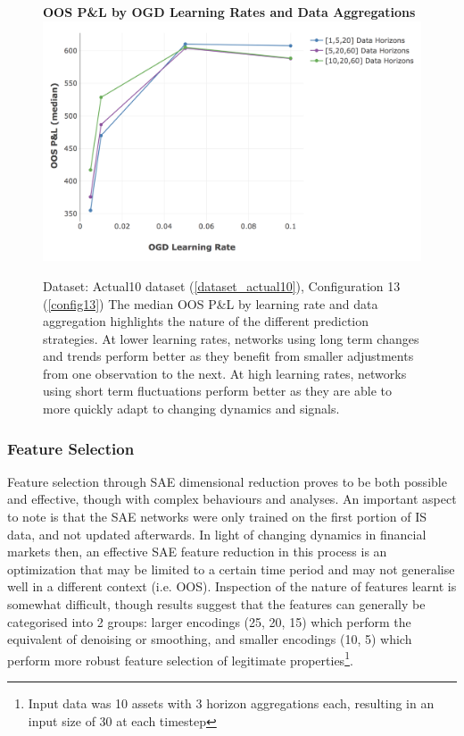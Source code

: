 \documentclass[a4paper,11pt,oneside]{article}
\theoremstyle{plain}
\theoremstyle{definition}
\begin{document}
	\begin{figure}[H]
		\textbf{OOS P\&L by OGD Learning Rates and Data Aggregations}
		\centering
		\includegraphics[scale=0.45]{images/results/primary/OOS_OGDLR_Delta_PL_median.png}
		\caption[OOS P\&L by OGD Learning Rates and Data Aggregations]
		{Dataset: Actual10 dataset (\ref{dataset_actual10}), Configuration 13 (\ref{config13})
			\newline The median OOS P\&L by learning rate and data aggregation highlights the nature of the different prediction strategies. At lower learning rates, networks using long term changes and trends perform better as they benefit from smaller adjustments from one observation to the next. At high learning rates, networks using short term fluctuations perform better as they are able to more quickly adapt to changing dynamics and signals.}
		\label{figure-actual_ogd_lr_data}
	\end{figure}
	
	\subsubsection{Feature Selection}
	
	Feature selection through SAE dimensional reduction proves to be both possible and effective, though with complex behaviours and analyses. An important aspect to note is that the SAE networks were only trained on the first portion of IS data, and not updated afterwards. In light of changing dynamics in financial markets then, an effective SAE feature reduction in this process is an optimization that may be limited to a certain time period and may not generalise well in a different context (i.e. OOS). Inspection of the nature of features learnt is somewhat difficult, though results suggest that the features can generally be categorised into 2 groups: larger encodings (25, 20, 15) which perform the equivalent of denoising or smoothing, and smaller encodings (10, 5) which perform more robust feature selection of legitimate properties\footnote{Input data was 10 assets with 3 horizon aggregations each, resulting in an input size of 30 at each timestep}.\newline
\end{document}

